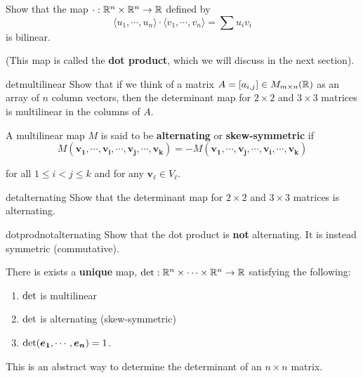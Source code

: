 \begin{problem}
    Show that the map $\cdot : \mathbb{R}^n \times \mathbb{R}^n \to \mathbb{R}$ defined by $$\langle u_1, \cdots, u_n \rangle \cdot \langle v_1 , \cdots, v_n \rangle = \sum u_iv_i$$
    is bilinear. 
    
    (This map is called the \textbf{dot product}, which we will discuss in the next section). 
\end{problem}


\begin{problem}{detmultilinear}
    Show that if we think of a matrix $A = [a_{i,j}] \in M_{m \times n}(\mathbb{R})$ as an array of $n$ column vectors, then the determinant map for $2 \times 2$ and $3 \times 3$ matrices is multilinear in the columns of $A$.
\end{problem}

\begin{definition}
    A multilinear map $M$ is said to be \textbf{alternating} or \textbf{skew-symmetric} if 
    $$M(\bm{v_1}, \cdots, \bm{v_i}, \cdots , \bm{v_j}, \cdots, \bm{v_k}) = -M(\bm{v_1}, \cdots, \bm{v_j}, \cdots , \bm{v_i}, \cdots, \bm{v_k}) $$
    
    for all $1 \leq i < j \leq k$ and for any $\bm{v_\ell} \in V_\ell$.
    
    \end{definition}
    
    \begin{problem}{detalternating}
        Show that the determinant map for $2 \times 2$ and $3 \times 3$ matrices is alternating.
    \end{problem}
    
    \begin{problem}{dotprodnotalternating}
        Show that the dot product is \textbf{not} alternating.  It is instead symmetric (commutative).
    \end{problem}

\begin{definition}
There is exists a \textbf{unique} map, $\textnormal{det} : \mathbb{R}^n \times \cdots \times \mathbb{R}^n \to \mathbb{R}$ satisfying the following:
\begin{enumerate}
    \item $\textnormal{det}$ is multilinear
    \item $\textnormal{det}$ is alternating (skew-symmetric)
    \item $\textnormal{det}(\bm{e_1}, \cdots, \bm{e_n}) = 1$.
\end{enumerate}

This is an abstract way to determine the determinant of an $n\times n$ matrix.
\end{definition}


